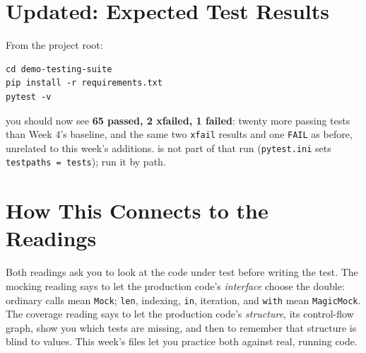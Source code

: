 \documentclass[11pt]{article}
\begin{document}
\section{Updated: Expected Test Results}
From the project root:
\begin{lstlisting}[style=shellstyle]
cd demo-testing-suite
pip install -r requirements.txt
pytest -v
\end{lstlisting}
you should now see \textbf{65 passed, 2 xfailed, 1 failed}: twenty
more passing tests than Week 4's baseline, and the same two
\texttt{xfail} results and one \texttt{FAIL} as before, unrelated to this
week's additions.  is not part of that
run (\texttt{pytest.ini} sets \texttt{testpaths = tests}); run it by path.

\section{How This Connects to the Readings}
\begin{keyidea}
Both readings ask you to look at the code under test before writing
the test. The mocking reading says to let the production code's
\emph{interface} choose the double: ordinary calls mean \texttt{Mock};
\texttt{len}, indexing, \texttt{in}, iteration, and \texttt{with} mean
\texttt{MagicMock}. The coverage reading says to let the production
code's \emph{structure}, its control-flow graph, show you which tests
are missing, and then to remember that structure is blind to values.
This week's files let you practice both against real, running code.
\end{keyidea}

\end{document}
